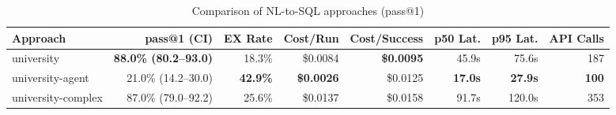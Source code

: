 \begin{table}[htbp]
\centering
\caption{Comparison of NL-to-SQL approaches (pass@1)}
\label{tab:comparison}
\begin{tabular}{lrrrrrrr}
\toprule
Approach & pass@1 (CI) & EX Rate & Cost/Run & Cost/Success & p50 Lat. & p95 Lat. & API Calls \\
\midrule
university & \textbf{88.0\% (80.2--93.0)} & 18.3\% & \$0.0084 & \textbf{\$0.0095} & 45.9s & 75.6s & 187 \\
university-agent & 21.0\% (14.2--30.0) & \textbf{42.9\%} & \textbf{\$0.0026} & \$0.0125 & \textbf{17.0s} & \textbf{27.9s} & \textbf{100} \\
university-complex & 87.0\% (79.0--92.2) & 25.6\% & \$0.0137 & \$0.0158 & 91.7s & 120.0s & 353 \\
\bottomrule
\end{tabular}
\end{table}
